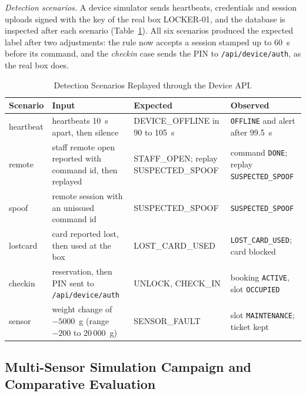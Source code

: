 \documentclass[journal,onecolumn]{IEEEtran}
\begin{document}
\textit{Detection scenarios.} A device simulator sends heartbeats, credentials and session uploads signed with the key
of the real box LOCKER-01, and the database is inspected after each scenario (Table~\ref{tab:scen}). All six scenarios
produced the expected label after two adjustments: the rule now accepts a session stamped up to 60~s before its
command, and the \emph{checkin} case sends the PIN to \texttt{/api/device/auth}, as the real box does.

\begin{table}[!htbp]
\renewcommand{\arraystretch}{1.12}
\centering
\small
\caption{Detection Scenarios Replayed through the Device API.}
\label{tab:scen}
\vspace{3pt}
\begin{tabular}{l >{\raggedright\arraybackslash}p{4.8cm} >{\raggedright\arraybackslash}p{3.6cm} >{\raggedright\arraybackslash}p{5.2cm}}
\hline
Scenario & Input & Expected & Observed \\
\midrule
\addlinespace[2pt]
heartbeat & 6 heartbeats 10~s apart, then silence & DEVICE\_OFFLINE in 90 to 105~s & \texttt{OFFLINE} and alert after 99.5~s \\[2pt]
remote    & staff remote open reported with command id, then replayed & STAFF\_OPEN; replay SUSPECTED\_SPOOF & command \texttt{DONE}; replay \texttt{SUSPECTED\_SPOOF} \\[2pt]
spoof     & remote session with an unissued command id & SUSPECTED\_SPOOF & \texttt{SUSPECTED\_SPOOF} \\[2pt]
lostcard  & card reported lost, then used at the box & LOST\_CARD\_USED & \texttt{LOST\_CARD\_USED}; card blocked \\[2pt]
checkin   & reservation, then PIN sent to \texttt{/api/device/auth} & UNLOCK, CHECK\_IN & booking \texttt{ACTIVE}, slot \texttt{OCCUPIED} \\[2pt]
sensor    & weight change of $-5000$~g (range $-200$ to 20\,000~g) & SENSOR\_FAULT & slot \texttt{MAINTENANCE}; ticket kept \\
\hline
\end{tabular}
\end{table}

\subsection{Multi-Sensor Simulation Campaign and Comparative Evaluation}
\label{sec:sim_eval}
\end{document}

